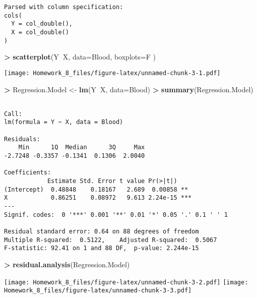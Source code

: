 \documentclass[]{article}
\newenvironment{Shaded}{\begin{snugshade}}{\end{snugshade}}
\newcommand{\KeywordTok}[1]{\textcolor[rgb]{0.13,0.29,0.53}{\textbf{#1}}}
\newcommand{\DataTypeTok}[1]{\textcolor[rgb]{0.13,0.29,0.53}{#1}}
\newcommand{\StringTok}[1]{\textcolor[rgb]{0.31,0.60,0.02}{#1}}
\newcommand{\OperatorTok}[1]{\textcolor[rgb]{0.81,0.36,0.00}{\textbf{#1}}}
\newcommand{\NormalTok}[1]{#1}
\begin{document}
\begin{verbatim}
Parsed with column specification:
cols(
  Y = col_double(),
  X = col_double()
)
\end{verbatim}

\begin{Shaded}
\begin{Highlighting}[]
\OperatorTok{>}\StringTok{ }\KeywordTok{scatterplot}\NormalTok{(Y}\OperatorTok{~}\NormalTok{X, }\DataTypeTok{data=}\NormalTok{Blood, }\DataTypeTok{boxplots=}\NormalTok{F )}
\end{Highlighting}
\end{Shaded}

\texttt{[image: Homework\_8\_files/figure-latex/unnamed-chunk-3-1.pdf]}

\begin{Shaded}
\begin{Highlighting}[]
\OperatorTok{>}\StringTok{ }\NormalTok{Regression.Model <-}\StringTok{ }\KeywordTok{lm}\NormalTok{(Y}\OperatorTok{~}\NormalTok{X, }\DataTypeTok{data=}\NormalTok{Blood)}
\OperatorTok{>}\StringTok{ }\KeywordTok{summary}\NormalTok{(Regression.Model)}
\end{Highlighting}
\end{Shaded}

\begin{verbatim}

Call:
lm(formula = Y ~ X, data = Blood)

Residuals:
    Min      1Q  Median      3Q     Max 
-2.7248 -0.3357 -0.1341  0.1306  2.0040 

Coefficients:
            Estimate Std. Error t value Pr(>|t|)    
(Intercept)  0.48848    0.18167   2.689  0.00858 ** 
X            0.86251    0.08972   9.613 2.24e-15 ***
---
Signif. codes:  0 '***' 0.001 '**' 0.01 '*' 0.05 '.' 0.1 ' ' 1

Residual standard error: 0.64 on 88 degrees of freedom
Multiple R-squared:  0.5122,    Adjusted R-squared:  0.5067 
F-statistic: 92.41 on 1 and 88 DF,  p-value: 2.244e-15
\end{verbatim}

\begin{Shaded}
\begin{Highlighting}[]
\OperatorTok{>}\StringTok{ }\KeywordTok{residual.analysis}\NormalTok{(Regression.Model)}
\end{Highlighting}
\end{Shaded}

\texttt{[image: Homework\_8\_files/figure-latex/unnamed-chunk-3-2.pdf]}
\texttt{[image: Homework\_8\_files/figure-latex/unnamed-chunk-3-3.pdf]}
\end{document}
